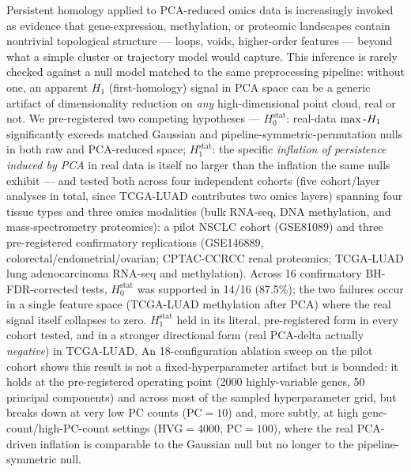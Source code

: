 Persistent homology applied to PCA-reduced omics data is increasingly invoked as evidence that gene-expression, methylation, or proteomic landscapes contain nontrivial topological structure --- loops, voids, higher-order features --- beyond what a simple cluster or trajectory model would capture. This inference is rarely checked against a null model matched to the same preprocessing pipeline: without one, an apparent $H_1$ (first-homology) signal in PCA space can be a generic artifact of dimensionality reduction on \emph{any} high-dimensional point cloud, real or not. We pre-registered two competing hypotheses --- $H_0^{\text{stat}}$: real-data $\max\text{-}H_1$ significantly exceeds matched Gaussian and pipeline-symmetric-permutation nulls in both raw and PCA-reduced space; $H_1^{\text{stat}}$: the specific \emph{inflation of persistence induced by PCA} in real data is itself no larger than the inflation the same nulls exhibit --- and tested both across four independent cohorts (five cohort/layer analyses in total, since TCGA-LUAD contributes two omics layers) spanning four tissue types and three omics modalities (bulk RNA-seq, DNA methylation, and mass-spectrometry proteomics): a pilot NSCLC cohort (GSE81089) and three pre-registered confirmatory replications (GSE146889, colorectal/endometrial/ovarian; CPTAC-CCRCC renal proteomics; TCGA-LUAD lung adenocarcinoma RNA-seq and methylation). Across 16 confirmatory BH-FDR-corrected tests, $H_0^{\text{stat}}$ was supported in 14/16 (87.5\%); the two failures occur in a single feature space (TCGA-LUAD methylation after PCA) where the real signal itself collapses to zero. $H_1^{\text{stat}}$ held in its literal, pre-registered form in every cohort tested, and in a stronger directional form (real PCA-delta actually \emph{negative}) in TCGA-LUAD. An 18-configuration ablation sweep on the pilot cohort shows this result is not a fixed-hyperparameter artifact but is bounded: it holds at the pre-registered operating point (2000 highly-variable genes, 50 principal components) and across most of the sampled hyperparameter grid, but breaks down at very low PC counts ($\mathrm{PC}=10$) and, more subtly, at high gene-count/high-PC-count settings (HVG$=4000$, PC$=100$), where the real PCA-driven inflation is comparable to the Gaussian null but no longer to the pipeline-symmetric null.

